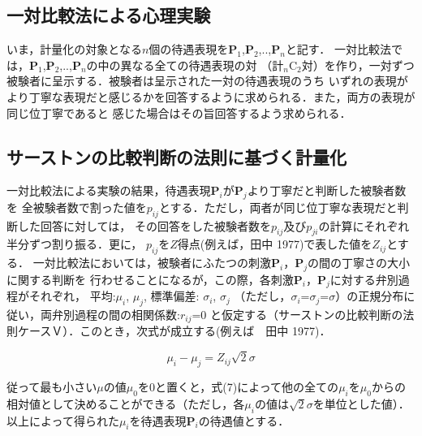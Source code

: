 \subsection{一対比較法による心理実験}
いま，計量化の対象となる\(n\)個の待遇表現を{\bf P}\(_{1}\),{\bf P}\(_{2}\),..,{\bf P}\(_{n}\)と記す．
一対比較法では，{\bf P}\(_{1}\),{\bf P}\(_{2}\),..,{\bf P}\(_{n}\)の中の異なる全ての待遇表現の対
\hspace{-0.5mm}（計\(_{n}\)C\(_{2}\)対）\hspace{-0.5mm}を作り，一対ずつ被験者に呈示する．被験者は呈示された一対の待遇表現のうち
いずれの表現がより丁寧な表現だと感じるかを回答するように求められる．また，両方の表現が同じ位丁寧であると
感じた場合はその旨回答するよう求められる．

\subsection{サーストンの比較判断の法則に基づく計量化}
一対比較法による実験の結果，待遇表現{\bf P}\(_{i}\)が{\bf P}\(_{j}\)より丁寧だと判断した被験者数を
全被験者数で割った値を\(p_{ij}\)とする．ただし，両者が同じ位丁寧な表現だと判断した回答に対しては，
その回答をした被験者数を\(p_{ij}\)及び\(p_{ji}\)の計算にそれぞれ半分ずつ割り振る．更に，
\(p_{ij}\)を\hspace{-0.2mm}\(Z\)\hspace{-0.2mm}得点(例えば，田中 1977)で表した値を\(Z_{ij}\)とする．
一対比較法においては，被験者にふたつの刺激{\bf P}\(_{i}\)，{\bf P}\(_{j}\)の間の丁寧さの大小に関する判断を
行わせることになるが，この際，各刺激{\bf P}\(_{i}\)，{\bf P}\(_{j}\)に対する弁別過程がそれぞれ，
平均:\(\mu_{i}\), \(\mu_{j}\), 標準偏差: \(\sigma_{i}\),  \(\sigma_{j}\)
（ただし，\(\sigma_{i}\)=\(\sigma_{j}\)=\(\sigma\)）の正規分布に従い，両弁別過程の間の相関係数:\(r_{ij}\)=0
と仮定する（サーストンの比較判断の法則ケースＶ）．このとき，次式が成立する(例えば　田中 1977)．

\begin{equation}
\mu_{i}-\mu_{j}=Z_{ij}\sqrt{2}\sigma
\end{equation}

従って最も小さい\hspace{-0.1mm}\(\mu\)\hspace{-0.1mm}の値\hspace{-0.1mm}\(\mu_{0}\)\hspace{-0.1mm}を0と置くと，式(7)によって他の全ての\hspace{-0.1mm}\(\mu_{i}\)\hspace{-0.1mm}を\hspace{-0.1mm}\(\mu_{0}\)\hspace{-0.1mm}からの
相対値として決めることができる（ただし，各\hspace{-0.2mm}\(\mu_{i}\)\hspace{-0.2mm}の値は\hspace{-0.2mm}\(\sqrt{2}\)\(\sigma\)\hspace{-0.2mm}を単位とした値）．
以上によって得られた\hspace{-0.2mm}\(\mu_{i}\)\hspace{-0.2mm}を待遇表現{\bf P}\(_{i}\)の待遇値とする． 

